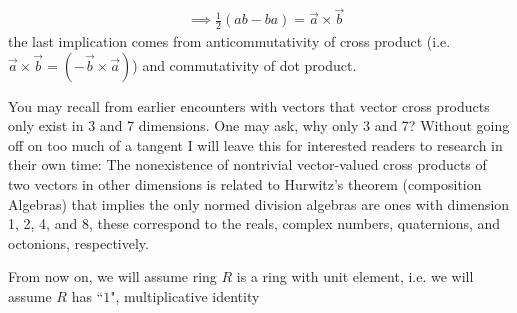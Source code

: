     \begin{align}
    &\implies \frac{1}{2}(ab-ba)=\overrightarrow{a}\times\overrightarrow{b} \nonumber
\end{align}
the last implication comes from anticommutativity of cross product (i.e. $\overrightarrow{a}\times \overrightarrow{b}= (-\overrightarrow{b}\times \overrightarrow{a})$) and commutativity of dot product. 

You may recall from earlier encounters with vectors that vector cross products only exist in 3 and 7 dimensions. One may ask, why only 3 and 7? Without going off on too much of a tangent I will leave this for interested readers to research in their own time: The nonexistence of nontrivial vector-valued cross products of two vectors in other dimensions is related to Hurwitz's theorem (composition Algebras) that implies the only normed division algebras are ones with dimension 1, 2, 4, and 8, these correspond to the reals, complex numbers, quaternions, and octonions, respectively.
\begin{tcolorbox}
\begin{center}
    From now on, we will assume ring $R$ is a ring with unit element, i.e. we will assume $R$ has ``$1$", multiplicative identity
\end{center}
\end{tcolorbox}
